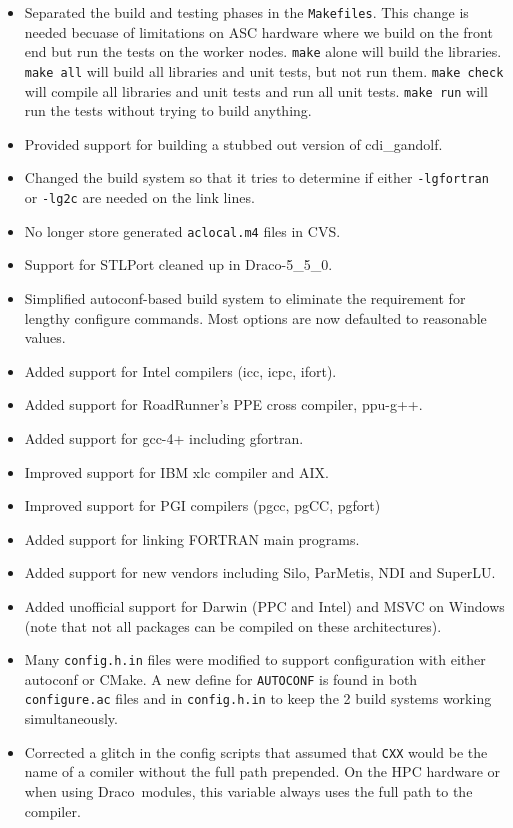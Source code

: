 \documentclass[note]{ResearchNote}
\newcommand{\draco}{Draco}
\newcommand{\CVS}{\textsf{CVS}}
\begin{document}
\begin{itemize}
\item Separated the build and testing phases in the
  \texttt{Makefiles}.  This change is needed becuase of limitations on
  ASC hardware where we build on the front end but run the tests on
  the worker nodes.  \texttt{make} alone will build the libraries.
  \texttt{make all} will build all libraries and unit tests, but not
  run them.   \texttt{make check} will compile all libraries and unit
  tests and run all unit tests.  \texttt{make run} will run the tests
  without trying to build anything.
\item Provided support for building a stubbed out version of
  \textsf{cdi\_gandolf}.
\item Changed the build system so that it tries to determine if either
  \texttt{-lgfortran} or \texttt{-lg2c} are needed on the link lines.
\item No longer store generated \texttt{aclocal.m4} files in \CVS.
\item Support for STLPort cleaned up in \draco-5\_5\_0.
\item Simplified autoconf-based build system to eliminate the
  requirement for lengthy configure commands.  Most options are now
  defaulted to reasonable values.
\item Added support for Intel compilers (icc, icpc, ifort).
\item Added support for RoadRunner's PPE cross compiler, ppu-g++.
\item Added support for gcc-4+ including gfortran.
\item Improved support for IBM xlc compiler and AIX.
\item Improved support for PGI compilers (pgcc, pgCC, pgfort)
\item Added support for linking FORTRAN main programs.
\item Added support for new vendors including Silo, ParMetis, NDI and
  SuperLU.
\item Added unofficial support for Darwin (PPC and Intel) and MSVC on
  Windows (note that not all packages can be compiled on these
  architectures).
\item Many \texttt{config.h.in} files were modified to support
  configuration with either \textsf{autoconf} or \textsf{CMake}. A new
  define for \texttt{AUTOCONF} is found in both \texttt{configure.ac}
  files and in \texttt{config.h.in} to keep the 2 build systems
  working simultaneously.
\item Corrected a glitch in the config scripts that assumed that
  \texttt{CXX} would be the name of a comiler without the full path
  prepended.  On the HPC hardware or when using \draco\ modules, this
  variable always uses the full path to the compiler.
\end{itemize}
\end{document}
